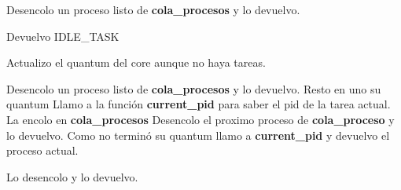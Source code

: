 \begin{algorithmic}

	\newline
		

			\State Desencolo un proceso listo de \textbf{cola\_procesos} y lo devuelvo.

		\Else
			\State Devuelvo IDLE\_TASK
		\EndIf

	\State Actualizo el quantum del core aunque no haya tareas.
	\newline
	
		\State Desencolo un proceso listo de \textbf{cola\_procesos} y lo devuelvo.
	\newline
	\Else
			\State Resto en uno su quantum
				\State Llamo a la función \textbf{current\_pid} para saber el pid de la tarea actual.
				\State La encolo en \textbf{cola\_procesos}
				\State Desencolo el proximo proceso de \textbf{cola\_proceso} y lo devuelvo.
			\Else
				\State Como no terminó su quantum llamo a \textbf{current\_pid} y devuelvo el proceso actual.
			\EndIf
		\Else
			
				\State Lo desencolo y lo devuelvo.
			\EndIf

		\EndIf
	\EndIf
\EndFunction	
\end{algorithmic}
